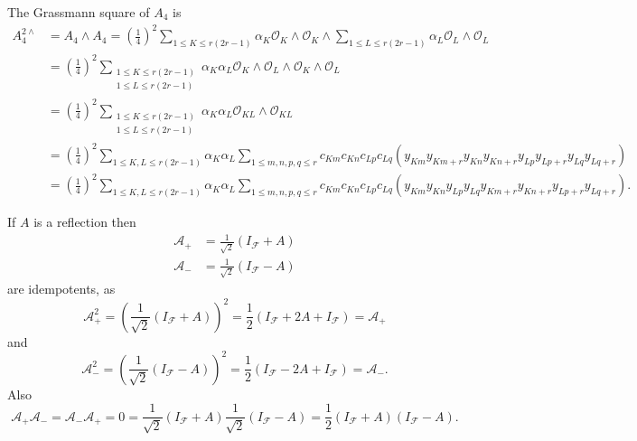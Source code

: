 \documentclass[aps, preprint]{revtex4}
\begin{document}
The Grassmann square of $A_{4}$ is
\begin{align*}A_{4}^{2 \wedge } &  =A_{4} \wedge A_{4} =\genfrac{(}{)}{}{}{1}{4}^{2} \sum _{1 \leq K \leq r \left (2 r -1\right )}\alpha _{K} \mathcal{O}_{K} \wedge \mathcal{O}_{K} \wedge \sum _{1 \leq L \leq r \left (2 r -1\right )}\alpha _{L} \mathcal{O}_{L} \wedge \mathcal{O}_{L} \\
 &  =\genfrac{(}{)}{}{}{1}{4}^{2} \sum _{\begin{array}{c}1 \leq K \leq r \left (2 r -1\right ) \\
1 \leq L \leq r \left (2 r -1\right )\end{array}}\alpha _{K} \alpha _{L} \mathcal{O}_{K} \wedge \mathcal{O}_{L} \wedge \mathcal{O}_{K} \wedge \mathcal{O}_{L} \\
 &  =\genfrac{(}{)}{}{}{1}{4}^{2} \sum _{\begin{array}{c}1 \leq K \leq r \left (2 r -1\right ) \\
1 \leq L \leq r \left (2 r -1\right )\end{array}}\alpha _{K} \alpha _{L} \mathcal{O}_{K L} \wedge \mathcal{O}_{K L} \\
 &  =\genfrac{(}{)}{}{}{1}{4}^{2} \sum _{1 \leq K ,L \leq r \left (2 r -1\right )}\alpha _{K} \alpha _{L} \sum _{1 \leq m ,n ,p ,q \leq r}c_{K m} c_{K n} c_{L p} c_{L q} \left (y_{K m} y_{K m +r} y_{K n} y_{K n +r} y_{L p} y_{L p +r} y_{L q} y_{L q +r}\right ) \\
 &  =\genfrac{(}{)}{}{}{1}{4}^{2} \sum _{1 \leq K ,L \leq r \left (2 r -1\right )}\alpha _{K} \alpha _{L} \sum _{1 \leq m ,n ,p ,q \leq r}c_{K m} c_{K n} c_{L p} c_{L q} \left (y_{K m} y_{K n} y_{L p} y_{L q} y_{K m +r} y_{K n +r} y_{L p +r} y_{L q +r}\right )\text{.}\end{align*}

If $A$ is a reflection then
\begin{align*}\mathcal{A}_{ +} &  =\frac{1}{\sqrt{2}} \left (I_{\mathcal{F}} +A\right ) \\
\mathcal{A}_{ -} &  =\frac{1}{\sqrt{2}} \left (I_{\mathcal{F}} -A\right )\end{align*}are idempotents, as
\begin{equation*}\mathcal{A}_{ +}^{2} =\left (\frac{1}{\sqrt{2}} \left (I_{\mathcal{F}} +A\right )\right )^{2} =\frac{1}{2} \left (I_{\mathcal{F}} +2 A +I_{\mathcal{F}}\right ) =\mathcal{A}_{ +}
\end{equation*}and
\begin{equation*}\mathcal{A}_{ -}^{2} =\left (\frac{1}{\sqrt{2}} \left (I_{\mathcal{F}} -A\right )\right )^{2} =\frac{1}{2} \left (I_{\mathcal{F}} -2 A +I_{\mathcal{F}}\right ) =\mathcal{A}_{ -}\text{.}
\end{equation*}Also
\begin{equation*}\mathcal{A}_{ +} \mathcal{A}_{ -} =\mathcal{A}_{ -} \mathcal{A}_{ +} =0 =\frac{1}{\sqrt{2}} \left (I_{\mathcal{F}} +A\right ) \frac{1}{\sqrt{2}} \left (I_{\mathcal{F}} -A\right ) =\frac{1}{2} \left (I_{\mathcal{F}} +A\right ) \left (I_{\mathcal{F}} -A\right )\text{.}
\end{equation*}
\end{document}

